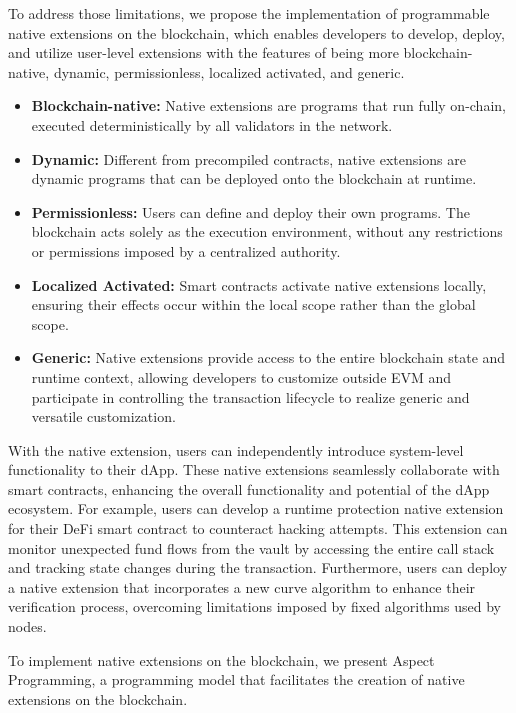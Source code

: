 To address those limitations, we propose the implementation of programmable native extensions on the blockchain, which enables developers to develop, deploy, and utilize user-level extensions with the features of being more blockchain-native, dynamic, permissionless, localized activated, and generic.

\begin{itemize}
    \item \textbf{Blockchain-native:} Native extensions are programs that run fully on-chain, executed deterministically by all validators in the network.
    \item \textbf{Dynamic:} Different from precompiled contracts, native extensions are dynamic programs that can be deployed onto the blockchain at runtime.
    \item \textbf{Permissionless:} Users can define and deploy their own programs. The blockchain acts solely as the execution environment, without any restrictions or permissions imposed by a centralized authority.
    \item \textbf{Localized Activated:} Smart contracts activate native extensions locally, ensuring their effects occur within the local scope rather than the global scope.
    \item \textbf{Generic:} Native extensions provide access to the entire blockchain state and runtime context, allowing developers to customize outside EVM and participate in controlling the transaction lifecycle to realize generic and versatile customization.
\end{itemize}

With the native extension, users can independently introduce system-level functionality to their dApp. These native extensions seamlessly collaborate with smart contracts, enhancing the overall functionality and potential of the dApp ecosystem. For example, users can develop a runtime protection native extension for their DeFi smart contract to counteract hacking attempts. This extension can monitor unexpected fund flows from the vault by accessing the entire call stack and tracking state changes during the transaction. Furthermore, users can deploy a native extension that incorporates a new curve algorithm to enhance their verification process, overcoming limitations imposed by fixed algorithms used by nodes.

To implement native extensions on the blockchain, we present Aspect Programming, a programming model that facilitates the creation of native extensions on the blockchain.

